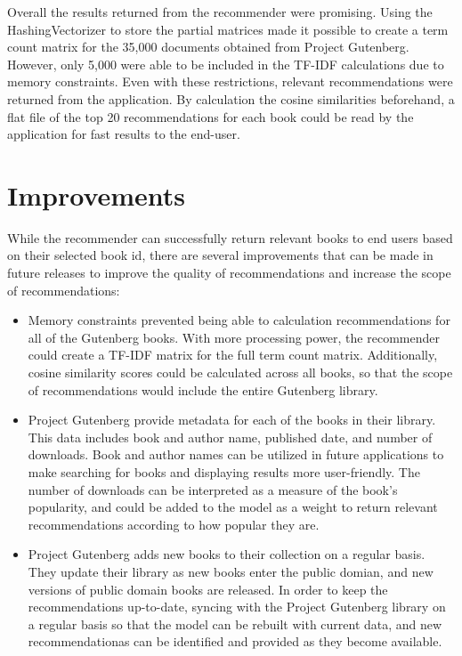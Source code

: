 \documentclass[10pt]{report}
\begin{document}
Overall the results returned from the recommender were promising. Using the HashingVectorizer to store the partial matrices made it possible to create a term count matrix for the 35,000 documents obtained from Project Gutenberg. However, only 5,000 were able to be included in the TF-IDF calculations due to memory constraints. Even with these restrictions, relevant recommendations were returned from the application. By calculation the cosine similarities beforehand, a flat file of the top 20 recommendations for each book could be read by the application for fast results to the end-user.

\section*{Improvements}
While the recommender can successfully return relevant books to end users based on their selected book id, there are several improvements that can be made in future releases to improve the quality of recommendations and increase the scope of recommendations:

\begin{itemize}
\item
Memory constraints prevented being able to calculation recommendations for all of the Gutenberg books. With more processing power, the recommender could create a TF-IDF matrix for the full term count matrix. Additionally, cosine similarity scores could be calculated across all books, so that the scope of recommendations would include the entire Gutenberg library.
\item
Project Gutenberg provide metadata for each of the books in their library. This data includes book and author name, published date, and number of downloads. Book and author names can be utilized in future applications to make searching for books and displaying results more user-friendly. The number of downloads can be interpreted as a measure of the book's popularity, and could be added to the model as a weight to return relevant recommendations according to how popular they are. 
\item
Project Gutenberg adds new books to their collection on a regular basis. They update their library as new books enter the public domian, and new versions of public domain books are released. In order to keep the recommendations up-to-date, syncing with the Project Gutenberg library on a regular basis so that the model can be rebuilt with current data, and new recommendationas can be identified and provided as they become available.
\end{itemize}
\end{document}
